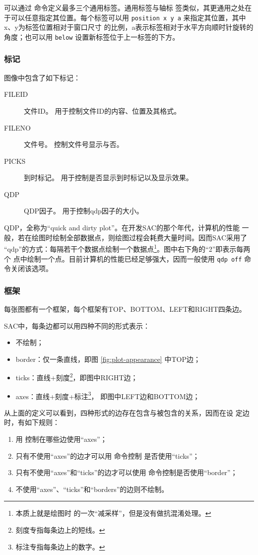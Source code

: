 可以通过  命令定义最多三个通用标签。通用标签与轴标
签类似，其更通用之处在于可以任意指定其位置。每个标签可以用
\texttt{position x y a} 来指定其位置，其中x、y为标签位置相对于窗口尺寸
的比例，a表示标签相对于水平方向顺时针旋转的角度；也可以用 \texttt{below}
设置新标签位于上一标签的下方。

\subsubsection{标记}
图像中包含了如下标记：
\begin{description}
\item [FILEID] 文件ID。 用于控制文件ID的内容、位置及其格式。
\item [FILENO] 文件号。 控制文件号显示与否。
\item [PICKS] 到时标记。 用于控制是否显示到时标记以及显示效果。
\item [QDP] QDP因子。 用于控制qdp因子的大小。
\end{description}

QDP，全称为``quick and dirty plot''。在开发SAC的那个年代，计算机的性能
一般，若在绘图时绘制全部数据点，则绘图过程会耗费大量时间。因而SAC采用了
``qdp''的方式：每隔若干个数据点绘制一个数据点\footnote{本质上就是绘图时
的一次``减采样''，但是没有做抗混淆处理。}。图中右下角的``2''即表示每两个
点中绘制一个点。目前计算机的性能已经足够强大，因而一般使用 \texttt{qdp off}
命令关闭该选项。

\subsubsection{框架}
每张图都有一个框架，每个框架有TOP、BOTTOM、LEFT和RIGHT四条边。

SAC中，每条边都可以用四种不同的形式表示：
\begin{itemize}
\item 不绘制；
\item border：仅一条直线，即图 \ref{fig:plot-appearance} 中TOP边；
\item ticks：直线+刻度\footnote{刻度专指每条边上的短线。}，即图中RIGHT边；
\item axes：直线+刻度+标注\footnote{标注专指每条边上的数字。}，
    即图中LEFT边和BOTTOM边；
\end{itemize}

从上面的定义可以看到，四种形式的边存在包含与被包含的关系，因而在设
定边时，有如下规则：
\begin{enumerate}
\item 用  控制在哪些边使用``axes''；
\item 只有不使用``axes''的边才可以用  命令控制
    是否使用``ticks''；
\item 只有不使用``axes''和``ticks''的边才可以使用 
    命令控制是否使用``border''；
\item 不使用``axes''、``ticks''和``borders''的边则不绘制。
\end{enumerate}

